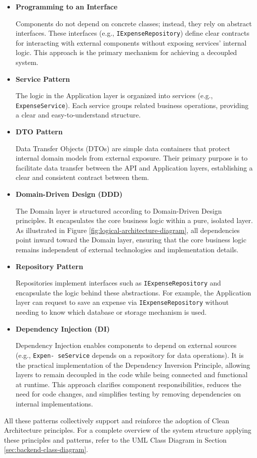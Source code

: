 \begin{itemize} [leftmargin=0.75cm, label=\textbullet]
    
    \item \textbf{Programming to an Interface}

    Components do not depend on concrete classes; instead, they rely on abstract interfaces. These interfaces (e.g., \texttt{IExpenseRepository}) define clear contracts for interacting with external components without exposing services' internal logic. This approach is the primary mechanism for achieving a decoupled system. 

    \item \textbf{Service Pattern}

    The logic in the Application layer is organized into services (e.g., \texttt{ExpenseService}). Each service groups related business operations, providing a clear and easy-to-understand structure. 

    \item \textbf{DTO Pattern}

    Data Transfer Objects (DTOs) are simple data containers that protect internal domain models from external exposure. Their primary purpose is to facilitate data transfer between the API and Application layers, establishing a clear and consistent contract between them. 

    \item \textbf{Domain-Driven Design (DDD)}

    The Domain layer is structured according to Domain-Driven Design principles. It encapsulates the core business logic within a pure, isolated layer. As illustrated in Figure \ref{fig:logical-architecture-diagram}, all dependencies point inward toward the Domain layer, ensuring that the core business logic remains independent of external technologies and implementation details.

    \item \textbf{Repository Pattern}

    Repositories implement interfaces such as \texttt{IExpenseRepository} and encapsulate the logic behind these abstractions. For example, the Application layer can request to save an expense via \texttt{IExpenseRepository} without needing to know which database or storage mechanism is used. 

    \item \textbf{Dependency Injection (DI)} 

    Dependency Injection enables components to depend on external sources (e.g., \texttt{Expen- seService} depends on a repository for data operations). It is the practical implementation of the Dependency Inversion Principle, allowing layers to remain decoupled in the code while being connected and functional at runtime. This approach clarifies component responsibilities, reduces the need for code changes, and simplifies testing by removing dependencies on internal implementations. 

\end{itemize}

All these patterns collectively support and reinforce the adoption of Clean Architecture principles. For a complete overview of the system structure applying these principles and patterns, refer to the UML Class Diagram in Section \ref{sec:backend-class-diagram}.
